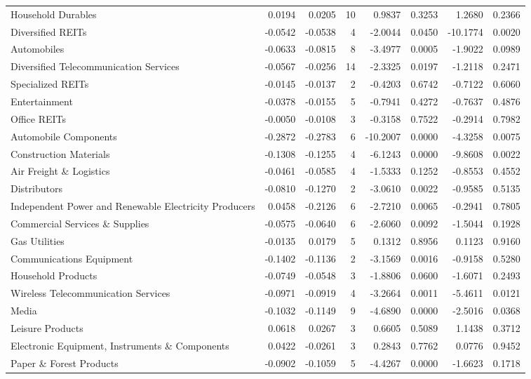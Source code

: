 \begin{table}
\begin{tabular}{lrrrrrrr}
Household Durables & 0.0194 & 0.0205 & 10 & 0.9837 & 0.3253 & 1.2680 & 0.2366 \\
Diversified REITs & -0.0542 & -0.0538 & 4 & -2.0044 & 0.0450 & -10.1774 & 0.0020 \\
Automobiles & -0.0633 & -0.0815 & 8 & -3.4977 & 0.0005 & -1.9022 & 0.0989 \\
Diversified Telecommunication Services & -0.0567 & -0.0256 & 14 & -2.3325 & 0.0197 & -1.2118 & 0.2471 \\
Specialized REITs & -0.0145 & -0.0137 & 2 & -0.4203 & 0.6742 & -0.7122 & 0.6060 \\
Entertainment & -0.0378 & -0.0155 & 5 & -0.7941 & 0.4272 & -0.7637 & 0.4876 \\
Office REITs & -0.0050 & -0.0108 & 3 & -0.3158 & 0.7522 & -0.2914 & 0.7982 \\
Automobile Components & -0.2872 & -0.2783 & 6 & -10.2007 & 0.0000 & -4.3258 & 0.0075 \\
Construction Materials & -0.1308 & -0.1255 & 4 & -6.1243 & 0.0000 & -9.8608 & 0.0022 \\
Air Freight \& Logistics & -0.0461 & -0.0585 & 4 & -1.5333 & 0.1252 & -0.8553 & 0.4552 \\
Distributors & -0.0810 & -0.1270 & 2 & -3.0610 & 0.0022 & -0.9585 & 0.5135 \\
Independent Power and Renewable Electricity Producers & 0.0458 & -0.2126 & 6 & -2.7210 & 0.0065 & -0.2941 & 0.7805 \\
Commercial Services \& Supplies & -0.0575 & -0.0640 & 6 & -2.6060 & 0.0092 & -1.5044 & 0.1928 \\
Gas Utilities & -0.0135 & 0.0179 & 5 & 0.1312 & 0.8956 & 0.1123 & 0.9160 \\
Communications Equipment & -0.1402 & -0.1136 & 2 & -3.1569 & 0.0016 & -0.9158 & 0.5280 \\
Household Products & -0.0749 & -0.0548 & 3 & -1.8806 & 0.0600 & -1.6071 & 0.2493 \\
Wireless Telecommunication Services & -0.0971 & -0.0919 & 4 & -3.2664 & 0.0011 & -5.4611 & 0.0121 \\
Media & -0.1032 & -0.1149 & 9 & -4.6890 & 0.0000 & -2.5016 & 0.0368 \\
Leisure Products & 0.0618 & 0.0267 & 3 & 0.6605 & 0.5089 & 1.1438 & 0.3712 \\
Electronic Equipment, Instruments \& Components & 0.0422 & -0.0261 & 3 & 0.2843 & 0.7762 & 0.0776 & 0.9452 \\
Paper \& Forest Products & -0.0902 & -0.1059 & 5 & -4.4267 & 0.0000 & -1.6623 & 0.1718 \\

\end{tabular}
\end{table}
